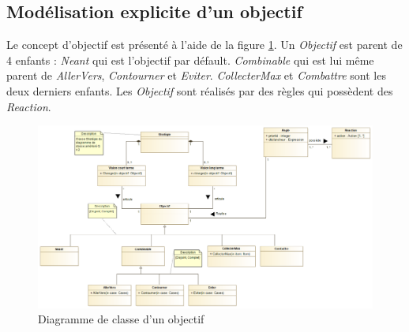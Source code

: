 
\subsection{Modélisation explicite d'un objectif}
\label{sec:question10}

Le concept d'objectif est présenté à l'aide de la figure \ref{fig:objectif}. Un \emph{Objectif} est parent de 4 enfants : \emph{Neant} qui est l'objectif par défault. \emph{Combinable} qui est lui même parent de \emph{AllerVers}, \emph{Contourner} et \emph{Eviter}.
\emph{CollecterMax} et \emph{Combattre} sont les deux derniers enfants.
Les \emph{Objectif} sont réalisés par des règles qui possèdent des \emph{Reaction}.

\begin{figure}
	\centering
	\includegraphics[width=500pt]{assets/class__Objectif}
	\caption{Diagramme de classe d'un objectif}
	\label{fig:objectif}
\end{figure}
